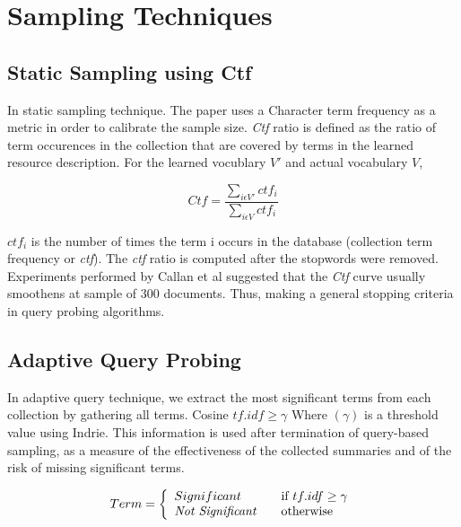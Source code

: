 \documentclass[paper=a4, fontsize=11pt,twoside]{scrartcl}	%
\begin{document}
\section{Sampling Techniques}
\label{sec:examples}


\subsection{Static Sampling using Ctf}

In static sampling technique. The paper uses a Character term frequency as a metric in order to calibrate the sample size. \textit{Ctf} ratio is defined as the ratio of  term occurences in the collection that are covered by terms in the learned resource description. For the learned vocublary $V'$ and actual vocabulary $V$, 

$$Ctf = \frac{\sum_{i\epsilon V'}  ctf_i}{\sum_{i\epsilon V} ctf_i}$$

$ctf_i$ is the number of times the term i occurs in the database (collection term frequency or \textit{ctf}).
The \textit{ctf} ratio is computed after the stopwords were removed. 
Experiments performed by Callan et al suggested that the \textit{Ctf} curve usually smoothens at sample of 300 documents. Thus, making a general stopping criteria in query probing algorithms.




\subsection{Adaptive Query Probing}

In adaptive query technique, we extract the most significant terms from each collection by gathering all terms.
Cosine $tf.idf \geq \gamma $  Where $(\gamma)$ is a threshold value using Indrie. This information is used after termination of query-based sampling, as a measure of the effectiveness of the collected summaries and of the risk of missing significant terms.

\[ Term = \left\{ 
  \begin{array}{l l}
    Significant & \quad \text{if $tf.idf \geq \gamma$}\\
    \textit{Not Significant} & \quad \text{otherwise}
  \end{array} \right.\]
\end{document}
